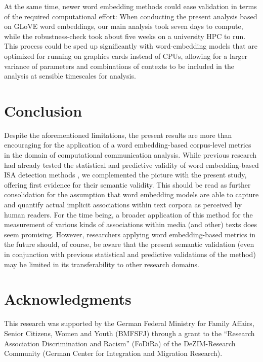 At the same time, newer word embedding methods could ease validation in terms of the required computational effort: When conducting the present analysis based on GLoVE word embeddings, our main analysis took seven days to compute, while the robustness-check took about five weeks on a university HPC to run. This process could be sped up significantly with word-embedding models that are optimized for running on graphics cards instead of CPUs, allowing for a larger variance of parameters and combinations of contexts to be included in the analysis at sensible timescales for analysis.

\section{Conclusion}

Despite the aforementioned limitations, the present results are more than encouraging for the application of a word embedding-based corpus-level metrics in the domain of computational communication analysis. While previous research had already tested the statistical and predictive validity of word embedding-based ISA detection methods \parencite{durrheim2023}, we complemented the picture with the present study, offering first evidence for their semantic validity. This should be read as further consolidation for the assumption that word embedding models are able to capture and quantify actual implicit associations within text corpora as perceived by human readers. For the time being, a broader application of this method for the measurement of various kinds of associations within media (and other) texts does seem promising. However, researchers applying word embedding-based metrics in the future should, of course, be aware that the present semantic validation (even in conjunction with previous statistical and predictive validations of the method) may be limited in its transferability to other research domains.

\section{Acknowledgments}

This research was supported by the German Federal Ministry for Family Affairs, Senior Citizens, Women and Youth (BMFSFJ) through a grant to the ``Research Association Discrimination and Racism'' (FoDiRa) of the DeZIM-Research Community (German Center for Integration and Migration Research).

